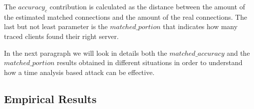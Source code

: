 The $accuracy_c$ contribution is calculated as the distance between the 
amount of the estimated matched connections
and the amount of the real connections.
The last but not least parameter is the $matched\_portion$ that indicates
how many traced clients found their right server.                                               %


In the next paragraph we will look in details both the
$matched\_accuracy$ and the
$matched\_portion$
results obtained in different situations in order to understand how a
time analysis based attack can be effective.

\subsection{Empirical Results}
